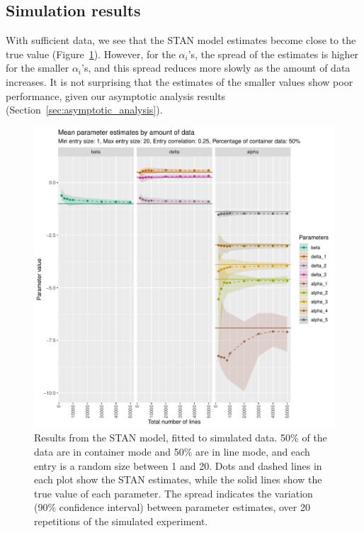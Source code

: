 \documentclass[aoas]{imsart}
\begin{document}

\subsection{Simulation results}
With sufficient data, we see that the STAN model estimates become close to the true value (Figure~\ref{fig:simulation_estimation}). However, for the \(\alpha_i\)'s, the spread of the estimates is higher for the smaller \(\alpha_i\)'s, and this spread reduces more slowly as the amount of data increases. It is not surprising that the estimates of the smaller values show poor performance, given our asymptotic analysis results (Section~\ref{sec:asymptotic_analysis}). 

\begin{figure}[h!]
\includegraphics[width=\textwidth]{../visualisations/new_figures/simulation_estimates_random_effect_quantiles.pdf}
\caption{Results from the STAN model, fitted to simulated data. 50\% of the data are in container mode and 50\% are in line mode, and each entry is a random size between 1 and 20. Dots and dashed lines in each plot show the STAN estimates, while the solid lines show the true value of each parameter. The spread indicates the variation (90\% confidence interval) between parameter estimates, over 20 repetitions of the simulated experiment.}
\label{fig:simulation_estimation}
\end{figure}
\end{document}

